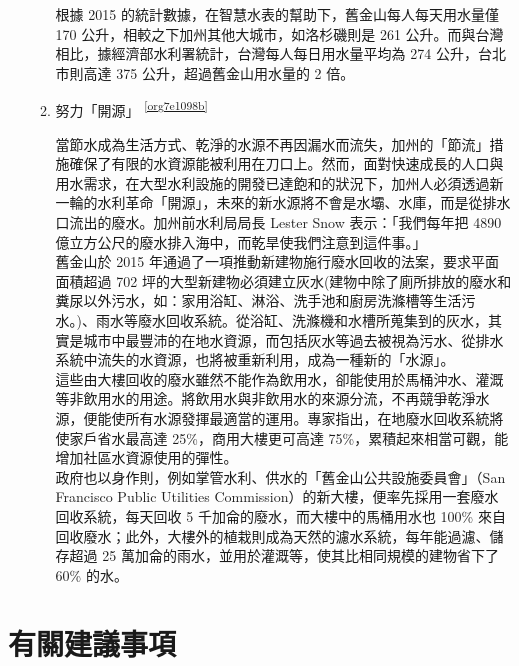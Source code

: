 \documentclass[a4paper,12pt]{article}
\begin{document}
\begin{enumerate}
\begin{enumerate}
根據 2015 的統計數據，在智慧水表的幫助下，舊金山每人每天用水量僅 170 公升，相較之下加州其他大城市，如洛杉磯則是 261 公升。而與台灣相比，據經濟部水利署統計，台灣每人每日用水量平均為 274 公升，台北市則高達 375 公升，超過舊金山用水量的 2 倍。\\

\item 努力「開源」 \textsuperscript{\ref{org7e1098b}}
\label{sec:orgf3ab85c}

當節水成為生活方式、乾淨的水源不再因漏水而流失，加州的「節流」措施確保了有限的水資源能被利用在刀口上。然而，面對快速成長的人口與用水需求，在大型水利設施的開發已達飽和的狀況下，加州人必須透過新一輪的水利革命「開源」，未來的新水源將不會是水壩、水庫，而是從排水口流出的廢水。加州前水利局局長 Lester Snow 表示：「我們每年把 4890 億立方公尺的廢水排入海中，而乾旱使我們注意到這件事。」\\

舊金山於 2015 年通過了一項推動新建物施行廢水回收的法案，要求平面面積超過 702 坪的大型新建物必須建立灰水(建物中除了廁所排放的廢水和糞尿以外污水，如：家用浴缸、淋浴、洗手池和廚房洗滌槽等生活污水。)、雨水等廢水回收系統。從浴缸、洗滌機和水槽所蒐集到的灰水，其實是城市中最豐沛的在地水資源，而包括灰水等過去被視為污水、從排水系統中流失的水資源，也將被重新利用，成為一種新的「水源」。\\

這些由大樓回收的廢水雖然不能作為飲用水，卻能使用於馬桶沖水、灌溉等非飲用水的用途。將飲用水與非飲用水的來源分流，不再競爭乾淨水源，便能使所有水源發揮最適當的運用。專家指出，在地廢水回收系統將使家戶省水最高達 25\%，商用大樓更可高達 75\%，累積起來相當可觀，能增加社區水資源使用的彈性。\\

政府也以身作則，例如掌管水利、供水的「舊金山公共設施委員會」（San Francisco Public Utilities Commission）的新大樓，便率先採用一套廢水回收系統，每天回收 5 千加侖的廢水，而大樓中的馬桶用水也 100\% 來自回收廢水；此外，大樓外的植栽則成為天然的濾水系統，每年能過濾、儲存超過 25 萬加侖的雨水，並用於灌溉等，使其比相同規模的建物省下了 60\% 的水。\\

\newpage
\end{enumerate}
\end{enumerate}

\section{有關建議事項}
\label{sec:org228e2d3}
\end{document}
